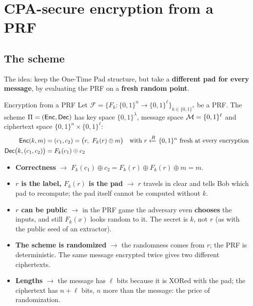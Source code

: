 
\section{CPA-secure encryption from a PRF}

\subsection{The scheme}

The idea: keep the One-Time Pad structure, but take a \textbf{different pad for every message}, by evaluating the PRF on a \textbf{fresh random point}.

\begin{frameddefn}[label={def:prf-enc}]{Encryption from a PRF}
  Let $\mathcal{F} = \{F_k : \{0,1\}^n \to \{0,1\}^\ell\}_{k \in \{0,1\}^\lambda}$ be a PRF. The scheme $\Pi = (\mathsf{Enc}, \mathsf{Dec})$ has key space $\{0,1\}^\lambda$, message space $\mathcal{M} = \{0,1\}^\ell$ and ciphertext space $\{0,1\}^n \times \{0,1\}^\ell$:
  \[
    \begin{aligned}
      \mathsf{Enc}(k, m) &= (c_1, c_2) = \big(r,\ F_k(r) \oplus m\big) && \text{with } r \xleftarrow{R} \{0,1\}^n \text{ fresh at every encryption} \\
      \mathsf{Dec}\big(k, (c_1, c_2)\big) &= F_k(c_1) \oplus c_2
    \end{aligned}
  \]
\end{frameddefn}

\begin{itemize}
  \item \textbf{Correctness} $\to$ $F_k(c_1) \oplus c_2 = F_k(r) \oplus F_k(r) \oplus m = m$.
  \item \textbf{$r$ is the label, $F_k(r)$ is the pad} $\to$ $r$ travels in clear and tells Bob which pad to recompute; the pad itself cannot be computed without $k$.
  \item \textbf{$r$ can be public} $\to$ in the PRF game the adversary even \textbf{chooses} the inputs, and still $F_k(x)$ looks random to it. The secret is $k$, not $r$ (as with the public seed of an extractor).
  \item \textbf{The scheme is randomized} $\to$ the randomness comes from $r$; the PRF is deterministic. The same message encrypted twice gives two different ciphertexts.
  \item \textbf{Lengths} $\to$ the message has $\ell$ bits because it is XORed with the pad; the ciphertext has $n + \ell$ bits, $n$ more than the message: the price of randomization.
\end{itemize}

